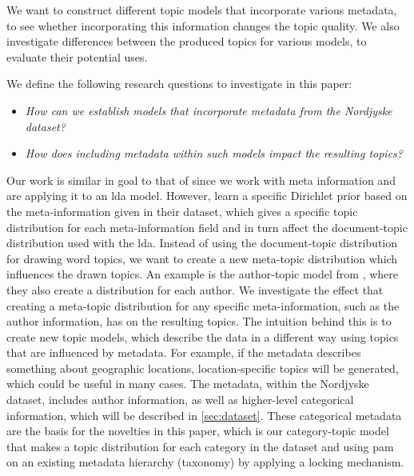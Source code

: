 We want to construct different topic models that incorporate various metadata, to see whether incorporating this information changes the topic quality. 
We also investigate differences between the produced topics for various models, to evaluate their potential uses.

We define the following research questions to investigate in this paper:

\begin{itemize}
	\item \textit{How can we establish models that incorporate metadata from the Nordjyske dataset?}
	\item \textit{How does including metadata within such models impact the resulting topics?}
\end{itemize}

Our work is similar in goal to that of \citet{MetaLDA2017} since we work with meta information and are applying it to an \gls{lda} model.
However, \citet{MetaLDA2017} learn a specific Dirichlet prior based on the meta-information given in their dataset, which gives a specific topic distribution for each meta-information field and in turn affect the document-topic distribution used with the \gls{lda}.
Instead of using the document-topic distribution for drawing word topics, we want to create a new meta-topic distribution which influences the drawn topics.
An example is the author-topic model from \citet{author_topic_2012}, where they also create a distribution for each author.
We investigate the effect that creating a meta-topic distribution for any specific meta-information, such as the author information, has on the resulting topics.
The intuition behind this is to create new topic models, which describe the data in a different way using topics that are influenced by metadata.
For example, if the metadata describes something about geographic locations, location-specific topics will be generated, which could be useful in many cases.
The metadata, within the Nordjyske dataset, includes author information, as well as higher-level categorical information, which will be described in \autoref{sec:dataset}.
These categorical metadata are the basis for the novelties in this paper, which is our category-topic model that makes a topic distribution for each category in the dataset and using \gls{pam} on an existing metadata hierarchy (taxonomy) by applying a locking mechanism.

